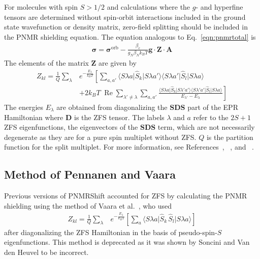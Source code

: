 \documentclass[11pt]{report}
\newcommand\PNMRShift{\textsf{PNMRShift}\xspace}
\renewcommand{\vec}{\bm}
\newcommand{\mat}{\bm}    %
\newcommand{\ten}{\bm}
\newcommand{\scop}[1]{\ensuremath{\hat{#1}}} %
\renewcommand{\Re}{\operatorname{Re}}
\begin{document}
For molecules with spin $S> 1/2$ and calculations where the $g$- and
hyperfine tensors are determined without spin-orbit interactions
included in the ground state wavefunction or density matrix,
zero-field splitting should be included in the PNMR shielding
equation. The equation analogous to Eq.~\ref{eqn:pnmrtotal}
is\cite{Soncini:2013a,Autschbach:2014p}
%
\begin{align}
\label{eqn:pnmrzfstotal}
\ten{\sigma} = \ten{\sigma}^{\mathrm{orb}} - \frac{\beta_e}{g_N \beta_N k_{B} T}
\ten{g} \cdot   \ten{Z} \cdot \ten{A}
\end{align}
%
The elements of the matrix $\ten{Z}$ are given by
%
\begin{align}
\label{eqn:sonc-sso}
Z_{kl}=\frac{1}{Q}
\sum_{\lambda} & e^{-                             
\frac{E_\lambda}{k_B T}} \left[\sum_{a,a'}\langle S\lambda a\vert \scop{S}_{k}\vert
S\lambda a'\rangle \langle S                                                     
\lambda a'\vert \scop{S}_{l}\vert S\lambda a\rangle \right. \nonumber \\               
&\left. +2 k_B T \; \Re \sum_{\lambda'\neq\lambda}                                         
\sum_{a,a'}\frac{\langle S\lambda a\vert \scop{S}_{k}\vert S\lambda'a'\rangle \langle  
S\lambda'a'\vert \scop{S}_{l}\vert S\lambda a\rangle}{E_{\lambda'}-E_{\lambda}} \right]
\end{align}
%
The energies $E_{\lambda}$ are obtained from diagonalizing the
$\vec{S}\mat{D}\vec{S}$ part of the EPR Hamiltonian where $\mat{D}$ is
the ZFS tensor.  The labels $\lambda$ and $a$ refer to the $2S+1$ ZFS
eigenfunctions, the eigenvectors of the $\vec{S}\mat{D}\vec{S}$ term,
which are not necessarily degenerate as they are for a pure spin
multiplet without ZFS. $Q$ is the partition function for the split
multiplet.  For more information, see
References~, ~, and
~.
%
\subsection{Method of Pennanen and Vaara}
Previous versions of \PNMRShift accounted for ZFS by calculating the PNMR
shielding using the method of Vaara et al.\ 
\cite{Pennanen:2008a,Liimatainen:2009a}, who used
%
\begin{align}
\label{eqn:vaara-sso}
Z_{kl}=\frac{1}{Q}
\sum_{\lambda} & e^{-                             
\frac{E_\lambda}{k_B T}} \left[\sum_{a}\langle S\lambda a\vert
                 \scop{S}_{k}\, \scop{S}_{l}\vert S\lambda a\rangle
                 \right ]
\end{align}
%
after diagonalizing the ZFS Hamiltonian in the basis of pseudo-spin-$S$
eigenfunctions. This method is deprecated as it was shown by Soncini
and Van den Heuvel to be incorrect. 
\end{document}
